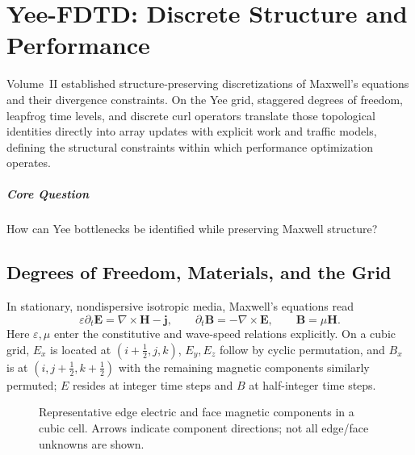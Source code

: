 \chapter{Yee-FDTD: Discrete Structure and Performance}\label{v0ch:24}
\begin{chaptersummary}
Volume~II established structure-preserving discretizations of Maxwell's equations and their divergence constraints. On the Yee grid, staggered degrees of freedom, leapfrog time levels, and discrete curl operators translate those topological identities directly into array updates with explicit work and traffic models, defining the structural constraints within which performance optimization operates.
\end{chaptersummary}
\paragraph{Core Question}How can Yee bottlenecks be identified while preserving Maxwell structure?

\section{Degrees of Freedom, Materials, and the Grid}
In stationary, nondispersive isotropic media, Maxwell's equations read
\[
 \varepsilon\partial_t\bm E=\nabla\times\bm H-\bm j,\qquad
 \partial_t\bm B=-\nabla\times\bm E,\qquad \bm B=\mu\bm H.
\]
Here $\varepsilon,\mu$ enter the constitutive and wave-speed relations explicitly. On a cubic grid, $E_x$ is located at $(i+\tfrac12,j,k)$, $E_y,E_z$ follow by cyclic permutation, and $B_x$ is at $(i,j+\tfrac12,k+\tfrac12)$ with the remaining magnetic components similarly permuted; $E$ resides at integer time steps and $B$ at half-integer time steps.

\begin{figure}[H]\centering
{}
\caption{Representative edge electric and face magnetic components in a cubic cell. Arrows indicate component directions; not all edge/face unknowns are shown.}
\end{figure}

